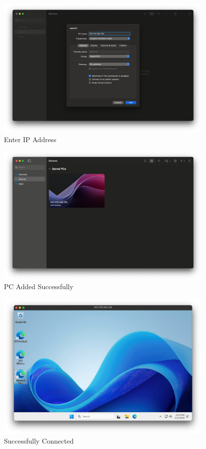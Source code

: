 \documentclass[a4paper,12pt]{article}
\begin{document}
\begin{figure}[H]
    \centering
    \includegraphics[width=0.95\textwidth]{connect-to-vm-5.png}
    \caption{Enter IP Address}
    \label{fig:connect5}
\end{figure}

\begin{figure}[H]
    \centering
    \includegraphics[width=0.95\textwidth]{connect-to-vm-6.png}
    \caption{PC Added Successfully}
    \label{fig:connect6}
\end{figure}

\begin{figure}[H]
    \centering
    \includegraphics[width=0.95\textwidth]{connect-to-vm-7.png}
    \caption{Successfully Connected}
    \label{fig:connect7}
\end{figure}
\end{document}
